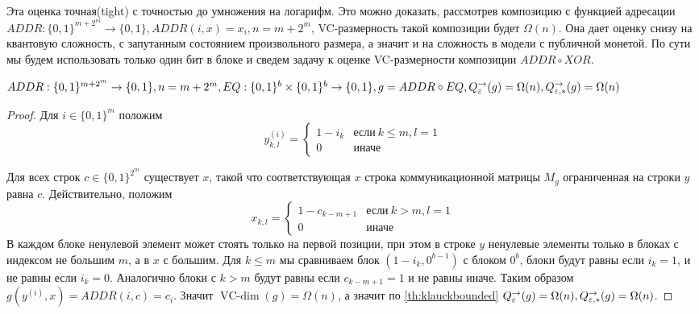 \documentclass{article}
\begin{document}
 Эта оценка точная(tight) с точностью до умножения на логарифм. Это можно доказать, рассмотрев композицию с функцией адресации $ADDR:\{0, 1\}^{m + 2^m} \to \{0, 1\}, ADDR(i, x) = x_i, n = m + 2^m$, VC-размерность такой композиции будет $\Omega(n)$. Она дает оценку снизу на квантовую сложность, с запутанным состоянием произвольного размера, а значит и на сложность в модели с публичной монетой. По сути мы будем использовать только один бит в блоке и сведем задачу к оценке VC-размерности композиции $ADDR\circ XOR$.
 \begin{theorem}
    $ADDR:\{0, 1\}^{m + 2^m} \to \{0, 1\}, n = m + 2^m, EQ:\{0, 1\}^b \times \{0, 1\}^b \to \{0, 1\}, g = ADDR \circ EQ, Q^{\to}_{\varepsilon}(g) = \Omega(n), Q^{\to}_{\varepsilon, *}(g) = \Omega(n)$
    \begin{proof}
        Для $i \in \{0, 1\}^m$ положим 
        $$y^{(i)}_{k,l} = 
        \begin{cases}
            1 - i_k&\textit{если}\ k \leq m, l = 1\\
            0&\textit{иначе}
        \end{cases}$$

    Для всех строк $c \in \{0, 1\}^{2^m}$ существует $x$, такой что соответствующая $x$ строка коммуникационной матрицы $M_g$ ограниченная на строки $y$ равна $c$. Действительно, положим 
    $$x_{k, l}  = \begin{cases}
        1 - c_{k-m + 1} &\textit{если}\ k > m, l = 1\\
        0 &\textit{иначе}
    \end{cases}$$
    В каждом блоке ненулевой элемент может стоять только на первой позиции, при этом в строке $y$ ненулевые элементы только в блоках с индексом не большим $m$, а в $x$ с большим. Для $k \leq m$ мы сравниваем блок $(1 - i_k, 0^{b - 1})$ с блоком $0^b$, блоки будут равны если $i_k = 1$, и не равны если $i_k = 0$. Аналогично блоки с $k > m$ будут равны если $c_{k - m + 1} = 1$ и не равны иначе. Таким образом $g(y^{(i)}, x) = ADDR(i, c) = c_i$. Значит $\operatorname{VC-dim}(g) = \Omega(n)$, а значит по \autoref{th:klauckbounded} $Q^{\to}_{\varepsilon}(g) = \Omega(n), Q^{\to}_{\varepsilon, *}(g) = \Omega(n)$.
\end{proof}
 \end{theorem}
\end{document}
